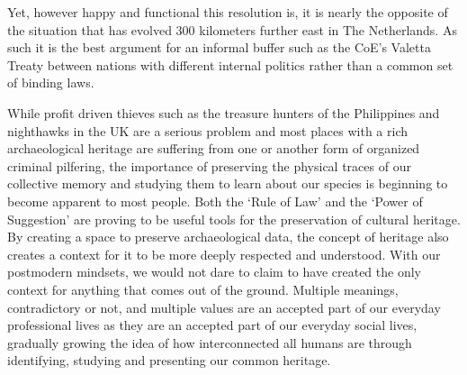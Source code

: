 \documentclass[english]{ijsra}
\begin{document}
Yet, however happy and functional this resolution is, it is nearly the opposite of the situation that has evolved 300 kilometers further east in The Netherlands. As such it is the best argument for an informal buffer such as the CoE’s Valetta Treaty between nations with different internal politics rather than a common set of binding laws. 


While profit driven thieves such as the treasure hunters of the Philippines and nighthawks in the UK are a serious problem and most places with a rich archaeological heritage are suffering from one or another form of organized criminal pilfering, the importance of preserving the physical traces of our collective memory and studying them to learn about our species is beginning to become apparent to most people. Both the ‘Rule of Law’ \parencite{RA10066} and the ‘Power of Suggestion’ \parencite{Valetta_1992} are proving to be useful tools for the preservation of cultural heritage. By creating a space to preserve archaeological data, the concept of heritage also creates a context for it to be more deeply respected and understood. With our postmodern mindsets, we would not dare to claim to have created the only context for anything that comes out of the ground. Multiple meanings, contradictory or not, and multiple values are an accepted part of our everyday professional lives as they are an accepted part of our everyday social lives, gradually growing the idea of how interconnected all humans are through identifying, studying and presenting our common heritage.





\IJSRAclosing
\end{document}
